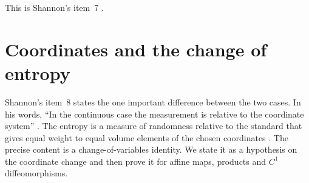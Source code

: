 This is Shannon's item~7 \cite[sec.~20, p.~37]{Shannon1948MathematicalTheory}.

\section{Coordinates and the change of entropy}
\label{sec:p15-w02b-p15-042-coordinates}

Shannon's item~8 states the one important difference between the two cases.
In his words, ``In the continuous case the measurement is relative to the
coordinate system'' \cite[sec.~20, p.~37]{Shannon1948MathematicalTheory}. The
entropy is a measure of randomness relative to the standard that gives equal
weight to equal volume elements of the chosen coordinates
\cite[sec.~20, p.~38]{Shannon1948MathematicalTheory}. The precise content is a
change-of-variables identity. We state it as a hypothesis on the coordinate
change and then prove it for affine maps, products and \(C^1\)
diffeomorphisms.

